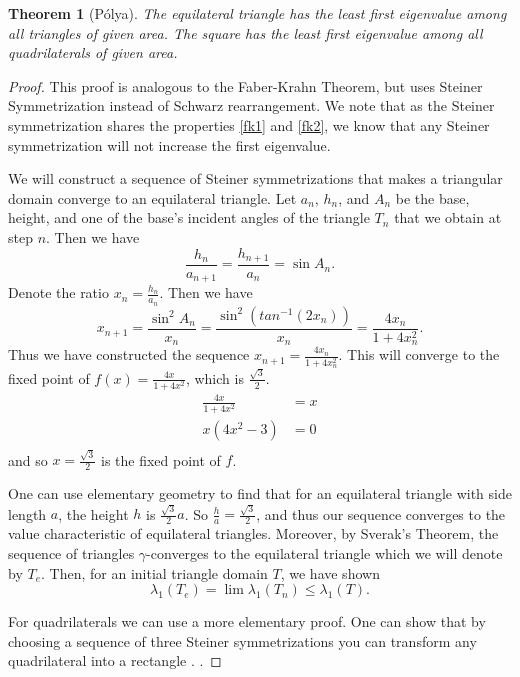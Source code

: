 \documentclass[12pt]{report}
\newtheorem{theorem}{Theorem}[section]
\numberwithin{definition}{section}
\begin{document}
\begin{theorem}[Pólya]
  The equilateral triangle has the least first eigenvalue among all triangles of given area.
  The square has the least first eigenvalue among all quadrilaterals of given area.
\end{theorem}

\begin{proof}
  This proof is analogous to the Faber-Krahn Theorem, but uses Steiner Symmetrization instead of Schwarz rearrangement.
  We note that as the Steiner symmetrization shares the properties \ref{fk1} and \ref{fk2}, we know that any Steiner symmetrization will not increase the first eigenvalue.


  We will construct a sequence of Steiner symmetrizations that makes a triangular domain converge to an equilateral triangle.
  Let $a_{n}$, $h_{n}$, and $A_{n}$ be the base, height, and one of the base's incident angles of the triangle $T_{n}$ that we obtain at step $n$.
  Then we have 
  \[
  \frac{h_{n}}{a_{n+1}} = \frac{h_{n+1}}{a_{n}} = \sin A_{n}
  .\] 
  Denote the ratio $x_{n} = \frac{h_{n}}{a_{n}}$.
  Then we have
  \[
  x_{n+1} = \frac{\sin^2 A_{n}}{x_{n}} = \frac{\sin^2(tan^{-1}(2x_{n}))}{x_{n}} = \frac{4x_{n}}{1 + 4x_{n}^2}
  .\] 
  Thus we have constructed the sequence $x_{n+1} = \frac{4x_{n}}{1 + 4x_{n}^2}$.
  This will converge to the fixed point of $f(x) = \frac{4x}{1 + 4x^2}$, which is $\frac{\sqrt{3}}{2}$.
  \begin{align*}
    \frac{4x}{1 + 4x^2} &= x \\
    x \left( 4x^2 - 3 \right ) &= 0 \\
  \end{align*}
  and so $x = \frac{\sqrt{3}}{2}$ is the fixed point of $f$.
    
  One can use elementary geometry to find that for an equilateral triangle with side length $a$, the height $h$ is  $\frac{\sqrt{3}}{2} a$.
  So $\frac{h}{a} = \frac{\sqrt{3}}{2}$, and thus our sequence converges to the value characteristic of equilateral triangles.
  Moreover, by Sverak's Theorem, the sequence of triangles $\gamma$-converges to the equilateral triangle which we will denote by $T_{e}$.
  Then, for an initial triangle domain $T$, we have shown 
  \[
  \lambda_{1}(T_{e}) = \lim \lambda_{1}(T_{n}) \leq \lambda_{1}(T)
  .\] 


  For quadrilaterals we can use a more elementary proof.
  One can show that by choosing a sequence of three Steiner symmetrizations you can transform any quadrilateral into a rectangle \cite{henrot}.
  .
\end{proof}
\end{document}
